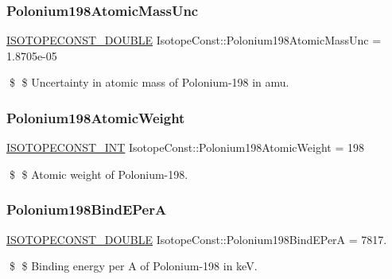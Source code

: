 \subsubsection{\texorpdfstring{Polonium198\+Atomic\+Mass\+Unc}{Polonium198AtomicMassUnc}}
{\footnotesize\ttfamily \mbox{\hyperlink{group___isotope_const-_macros_ga8f45a7272ce02c0b4c65c44636ed719a}{I\+S\+O\+T\+O\+P\+E\+C\+O\+N\+S\+T\+\_\+\+D\+O\+U\+B\+LE}} Isotope\+Const\+::\+Polonium198\+Atomic\+Mass\+Unc = 1.\+8705e-\/05}

\$ \$ Uncertainty in atomic mass of Polonium-\/198 in amu. \mbox{\label{group___isotope_const-_polonium-_po198_ga935d25ee0c109cbb5c79ac6de896eaa2}} 
\subsubsection{\texorpdfstring{Polonium198\+Atomic\+Weight}{Polonium198AtomicWeight}}
{\footnotesize\ttfamily \mbox{\hyperlink{group___isotope_const-_macros_ga5f18360b3e99483a35c32d789e62621c}{I\+S\+O\+T\+O\+P\+E\+C\+O\+N\+S\+T\+\_\+\+I\+NT}} Isotope\+Const\+::\+Polonium198\+Atomic\+Weight = 198}

\$ \$ Atomic weight of Polonium-\/198. \mbox{\label{group___isotope_const-_polonium-_po198_ga3aa0ccdccfd0d351779c22f3c9f16274}} 
\subsubsection{\texorpdfstring{Polonium198\+Bind\+E\+PerA}{Polonium198BindEPerA}}
{\footnotesize\ttfamily \mbox{\hyperlink{group___isotope_const-_macros_ga8f45a7272ce02c0b4c65c44636ed719a}{I\+S\+O\+T\+O\+P\+E\+C\+O\+N\+S\+T\+\_\+\+D\+O\+U\+B\+LE}} Isotope\+Const\+::\+Polonium198\+Bind\+E\+PerA = 7817.}

\$ \$ Binding energy per A of Polonium-\/198 in keV. \mbox{\label{group___isotope_const-_polonium-_po198_gaa51a7f9de16f070741ee8cac7cf36f4d}} 
